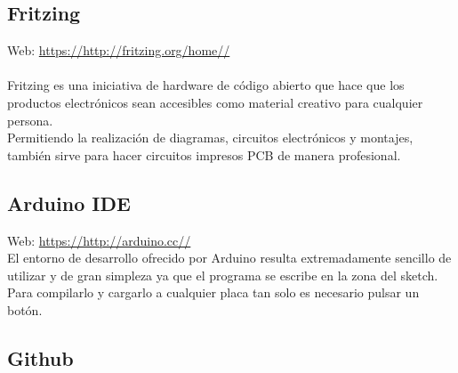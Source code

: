 \subsection{Fritzing}


Web: \url{https://http://fritzing.org/home//} \cite{website:1} \\

\\Fritzing es una iniciativa de hardware de código abierto que hace que los productos electrónicos sean accesibles como material creativo para cualquier persona.\\

Permitiendo la realización de diagramas, circuitos electrónicos y montajes, también sirve para hacer circuitos impresos PCB de manera profesional.

\subsection{Arduino IDE}


Web: \url{https://http://arduino.cc//} \cite{website:1} \\

El entorno de desarrollo ofrecido por Arduino resulta extremadamente sencillo de utilizar y de gran simpleza ya que el programa se escribe en la zona del sketch. Para compilarlo y
cargarlo a cualquier placa tan solo es necesario pulsar un botón.\\


\subsection{Github}

